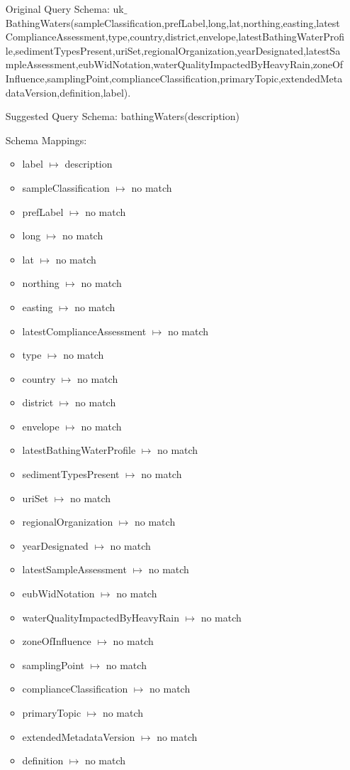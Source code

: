 \documentclass[a4paper,10pt]{article}
\begin{document}
\begin{itemize}
\item[Original Query Schema:] uk$\_$BathingWaters(sampleClassification,prefLabel,long,lat,northing,easting,latestComplianceAssessment,type,country,district,envelope,latestBathingWaterProfile,sedimentTypesPresent,uriSet,regionalOrganization,yearDesignated,latestSampleAssessment,eubWidNotation,waterQualityImpactedByHeavyRain,zoneOfInfluence,samplingPoint,complianceClassification,primaryTopic,extendedMetadataVersion,definition,label).


\item[Suggested Query Schema: ]
bathingWaters(description)
\item[Schema Mappings:] 
	\begin{itemize}
	
\item label $\mapsto$ description
\item  sampleClassification $\mapsto$ no match 
\item  prefLabel $\mapsto$ no match 
\item  long $\mapsto$ no match 
\item  lat $\mapsto$ no match 
\item  northing $\mapsto$ no match 
\item  easting $\mapsto$ no match 
\item  latestComplianceAssessment $\mapsto$ no match 
\item  type $\mapsto$ no match 
\item  country $\mapsto$ no match 
\item  district $\mapsto$ no match 
\item  envelope $\mapsto$ no match 
\item  latestBathingWaterProfile $\mapsto$ no match 
\item  sedimentTypesPresent $\mapsto$ no match 
\item  uriSet $\mapsto$ no match 
\item  regionalOrganization $\mapsto$ no match 
\item  yearDesignated $\mapsto$ no match 
\item  latestSampleAssessment $\mapsto$ no match 
\item  eubWidNotation $\mapsto$ no match 
\item  waterQualityImpactedByHeavyRain $\mapsto$ no match 
\item  zoneOfInfluence $\mapsto$ no match 
\item  samplingPoint $\mapsto$ no match 
\item  complianceClassification $\mapsto$ no match 
\item  primaryTopic $\mapsto$ no match 
\item  extendedMetadataVersion $\mapsto$ no match 
\item  definition $\mapsto$ no match 

	\end{itemize}

\end{itemize}
\end{document}
